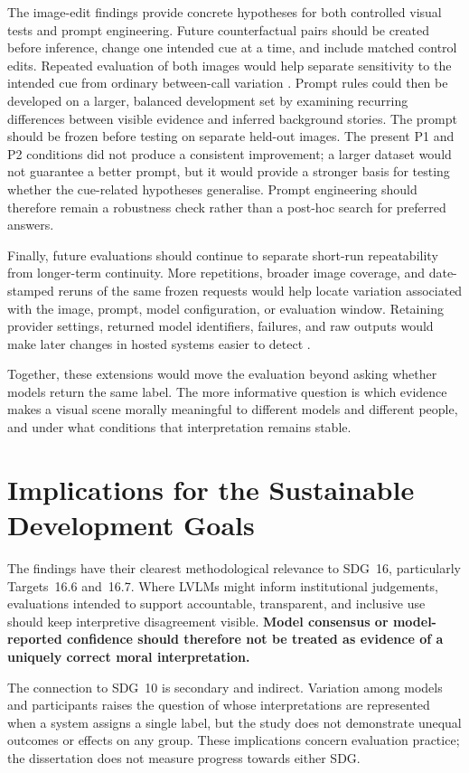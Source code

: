 The image-edit findings provide concrete hypotheses for both controlled visual
tests and prompt engineering. Future counterfactual pairs should be created
before inference, change one intended cue at a time, and include matched control
edits. Repeated evaluation of both images would help separate sensitivity to
the intended cue from ordinary between-call variation
\cite{liu2026moralbackbone}. Prompt rules could then be developed on a larger,
balanced development set by examining recurring differences between visible
evidence and inferred background stories. The prompt should be frozen before
testing on separate held-out images. The present P1 and P2 conditions did not
produce a consistent improvement; a larger dataset would not guarantee a
better prompt, but it would provide a stronger basis for testing whether the
cue-related hypotheses generalise. Prompt engineering should therefore remain
a robustness check rather than a post-hoc search for preferred answers.

Finally, future evaluations should continue to separate short-run
repeatability from longer-term continuity. More repetitions, broader image
coverage, and date-stamped reruns of the same frozen requests would help locate
variation associated with the image, prompt, model configuration, or
evaluation window. Retaining provider settings, returned model identifiers,
failures, and raw outputs would make later changes in hosted systems easier to
detect \cite{chen2024changing}.

Together, these extensions would move the evaluation beyond asking whether
models return the same label. The more informative question is which evidence
makes a visual scene morally meaningful to different models and different
people, and under what conditions that interpretation remains stable.

\section{Implications for the Sustainable Development Goals}
\label{sec:sdg_implications}

The findings have their clearest methodological relevance to SDG~16,
particularly Targets~16.6 and~16.7. Where LVLMs might inform institutional
judgements, evaluations intended to support accountable, transparent, and
inclusive use should keep interpretive disagreement visible.
\textbf{Model consensus or model-reported confidence should therefore not be
treated as evidence of a uniquely correct moral interpretation.}

The connection to SDG~10 is secondary and indirect. Variation among models and
participants raises the question of whose interpretations are represented when
a system assigns a single label, but the study does not demonstrate unequal
outcomes or effects on any group. These implications concern evaluation
practice; the dissertation does not measure progress towards either SDG.

